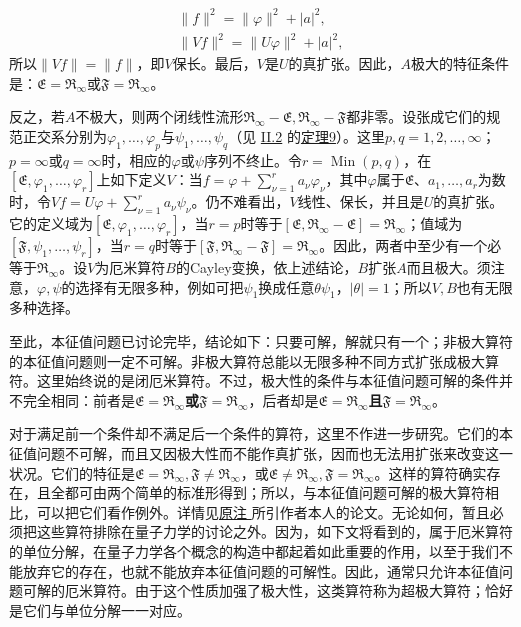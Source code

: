 \documentclass[fontsize=13pt,twoside,openany,headings=normal,parskip=false,bookmarkpackage=false,DIV=calc]{scrbook}
\begin{document}
\hypertarget{origpage-87}{}\label{origpage-87}\begin{gather*}
\|f\|^2=\|\varphi\|^2+|a|^2,\\
\|Vf\|^2=\|U\varphi\|^2+|a|^2,
\end{gather*}
所以$\|Vf\|=\|f\|$，即$V$保长。最后，$V$是$U$的真扩张。因此，$A$极大的特征条件是：$\mathfrak E=\mathfrak R_\infty$或$\mathfrak F=\mathfrak R_\infty$。

反之，若$A$不极大，则两个闭线性流形$\mathfrak R_\infty-\mathfrak E,\allowbreak \mathfrak R_\infty-\mathfrak F$都非零。设张成它们的规范正交系分别为$\varphi_1,\allowbreak \ldots,\allowbreak \varphi_p$与$\psi_1,\allowbreak \ldots,\allowbreak \psi_q$（见 \hyperref[sec:II.2]{II.2} 的\CJKglue \hyperref[thm:II.9]{定理9}）。这里$p,\allowbreak q=1,\allowbreak 2,\allowbreak \ldots,\allowbreak \infty$；$p=\infty$或$q=\infty$时，相应的$\varphi$或$\psi$序列不终止。令$r=\operatorname{Min}(p,\allowbreak q)$，在$[\mathfrak E,\allowbreak \varphi_1,\allowbreak \ldots,\allowbreak \varphi_r]$上如下定义$V$：当$f=\varphi+\sum_{\nu=1}^ra_\nu\varphi_\nu$，其中$\varphi$属于$\mathfrak E$、$a_1,\allowbreak \ldots,\allowbreak a_r$为数时，令$Vf=U\varphi+\sum_{\nu=1}^ra_\nu\psi_\nu$。仍不难看出，$V$线性、保长，并且是$U$的真扩张。它的定义域为$[\mathfrak E,\allowbreak \varphi_1,\allowbreak \ldots,\allowbreak \varphi_r]$，当$r=p$时等于$[\mathfrak E,\allowbreak \mathfrak R_\infty-\mathfrak E]=\mathfrak R_\infty$；值域为$[\mathfrak F,\allowbreak \psi_1,\allowbreak \ldots,\allowbreak \psi_r]$，当$r=q$时等于$[\mathfrak F,\allowbreak \mathfrak R_\infty-\mathfrak F]=\mathfrak R_\infty$。因此，两者中至少有一个必等于$\mathfrak R_\infty$。设$V$为厄米算符$B$的Cayley变换，依上述结论，$B$扩张$A$而且极大。须注意，$\varphi,\allowbreak \psi$的选择有无限多种，例如可把$\psi_1$换成任意$\theta\psi_1$，$|\theta|=1$；所以$V,\allowbreak B$也有无限多种选择。

至此，本征值问题已讨论完毕，结论如下：只要可解，解就只有一个；非极大算符的本征值问题则一定不可解。非极大算符总能以无限多种不同方式扩张成极大算符。这里始终说的是闭厄米算符。不过，极大性的条件与本征值问题可解的条件并不完全相同：前者是$\mathfrak E=\mathfrak R_\infty$\textbf{或}$\mathfrak F=\mathfrak R_\infty$，后者却是$\mathfrak E=\mathfrak R_\infty$\textbf{且}$\mathfrak F=\mathfrak R_\infty$。

对于满足前一个条件却不满足后一个条件的算符，这里不作进一步研究。它们的本征值问题不可解，而且又因极大性而不能作真扩张，因而也无法用扩张来改变这一状况。它们的特征是$\mathfrak E=\mathfrak R_\infty,\allowbreak \mathfrak F\ne\mathfrak R_\infty$，或$\mathfrak E\ne\mathfrak R_\infty,\allowbreak \mathfrak F=\mathfrak R_\infty$。这样的算符确实存在，且全都可由两个简单的标准形得到；所以，与本征值问题可解的极大算符相比，可以把它们看作例外。详情见\CJKglue \hyperlink{note-95}{原注 } 所引作者本人的论文。无论如何，暂且必须把这些算符排除在量子力学的讨论之外。因为，如下文将看到的，属于厄米算符的单位分解，在量子力学各个概念的构造中都起着如此重要的作用，\hypertarget{origpage-88}{}\label{origpage-88}以至于我们不能放弃它的存在，也就不能放弃本征值问题的可解性。因此，通常只允许本征值问题可解的厄米算符。由于这个性质加强了极大性，这类算符称为超极大算符；恰好是它们与单位分解一一对应。
\end{document}
